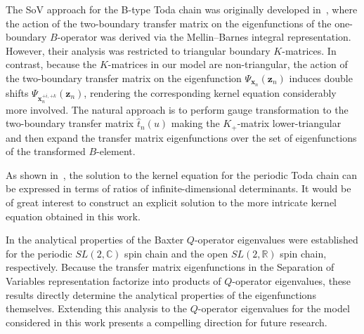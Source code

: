 \documentclass[a4paper,11pt]{article}
\numberwithin{equation}{section}
\begin{document}
The SoV approach for the B-type Toda chain was originally developed in~\cite{IS}, where the action of the two-boundary transfer matrix on the eigenfunctions of the one-boundary $B$-operator was derived via the Mellin--Barnes integral representation. However, their analysis was restricted to triangular boundary $K$-matrices. In contrast, because the $K$-matrices in our model are non-triangular, the action of the two-boundary transfer matrix on the eigenfunction $\Psi_{\bm{x}_{n}}(\bm{z}_n)$ induces double shifts $\Psi_{\bm{x}_{n}^{+i,+k}}(\bm{z}_n)$, rendering the corresponding kernel equation considerably more involved. The natural approach is to perform gauge transformation to the two-boundary transfer matrix $\hat{t}_n(u)$ making the $K_+$-matrix lower-triangular and then expand the transfer matrix eigenfunctions over the set of eigenfunctions of  the transformed $B$-element.

As shown in~\cite{KL3}, the solution to the kernel equation for the periodic Toda chain can be expressed in terms of ratios of infinite-dimensional determinants. It would be of great interest to construct an explicit solution to the more intricate kernel equation obtained in this work.

In \cite{DKM, DKM2} the analytical properties of the Baxter $Q$-operator eigenvalues were established for the periodic $SL(2,\mathbb{C})$ spin chain and the open $SL(2,\mathbb{R})$ spin chain, respectively. Because the transfer matrix eigenfunctions in the Separation of Variables representation factorize into products of $Q$-operator eigenvalues, these results directly determine the analytical properties of the eigenfunctions themselves. Extending this analysis to the $Q$-operator eigenvalues for the model considered in this work presents a compelling direction for future research.
\end{document}
